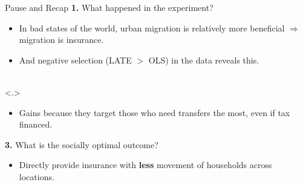 \documentclass[9pt,pdftex,aspectratio=1610]{beamer}
\theoremstyle{definition}
\begin{document}
\begin{frame}[t]{Pause and Recap}
\textbf{1.} What happened in the experiment?
\begin{itemize}
\smallskip
\item In bad states of the world, urban migration is relatively more beneficial $\Rightarrow$ migration is insurance. 
\smallskip
\item And negative selection (LATE $>$ OLS) in the data reveals this. 
\end{itemize}
\bigskip
{} \\
\uncover<.>{
\begin{itemize}
\smallskip
\item Gains because they target those who need transfers the most, even if tax financed.  
\smallskip
\end{itemize}
\bigskip
\textbf{3.} What is the socially optimal outcome? \\
\begin{itemize}
\item Directly provide insurance with \textbf{less} movement of households across locations. 
\smallskip
\end{itemize}}
\end{frame}
\end{document}
